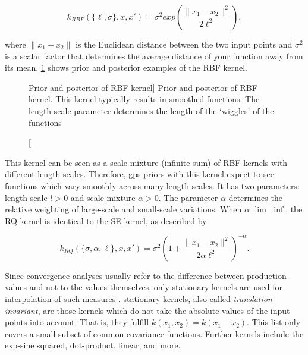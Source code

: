 \begin{description}
	\begin{equation}
	\label{eq:RBF_kernel}
	k_{RBF}(\{\ell, \sigma\}, x, x') = \sigma^2 exp\left(\frac{\lVert x_1 - x_2 \lVert ^2}{2\ell^2}\right),
	\end{equation}
	
	where $\lVert x_1 - x_2 \lVert$ is the Euclidean distance between the two input points and $\sigma^2$ is a scalar factor that determines the average distance of your function away from its mean.
	\cref{fig:RBF_prior_posterior} shows prior and posterior examples of the RBF kernel.
	
	\begin{figure}[t]
		\centering
		\hfill %
		\caption
		[Prior and posterior of RBF kernel]
		{Prior and posterior of RBF kernel.
			This kernel typically results in smoothed functions.
			The length scale parameter determines the length of the \enquote*{wiggles} of the functions}
		\label{fig:RBF_prior_posterior}
	\end{figure}
	
	\item[Rational quadratic kernel]
	This kernel can be seen as a scale mixture (infinite sum) of RBF kernels with different length scales.
	Therefore, \acp{gp} priors with this kernel expect to see functions which vary smoothly across many length scales.
	It has two parameters: length scale $l > 0$ and scale mixture $\alpha > 0$.
	The parameter $\alpha$ determines the relative weighting of large-scale and small-scale variations.
	When $\alpha$ $\lim$ $\inf$, the RQ kernel is identical to the SE kernel, as described by
	
	\begin{equation}
	\label{eq:RQ_kernel}
	k_{RQ}(\{\sigma, \alpha, \ell\}, x, x') = \sigma^2 \left( 1 + \frac{\lVert x_1 - x_2 \lVert ^2}{2\alpha \ell^2} \right)^{-\alpha}.
	\end{equation}
	
	
\end{description}

Since convergence analyses usually refer to the difference between production values and not to the values themselves, only stationary kernels are used for interpolation of such measures .
stationary kernels, also called \textit{translation invariant}, are those kernels which do not take the absolute values of the input points into account.
That is, they fulfill $k(x_1, x_2) = k(x_1 - x_2)$.
This list only covers a small subset of common covariance functions.
Further kernels include the exp-sine squared, dot-product, linear, and more.

